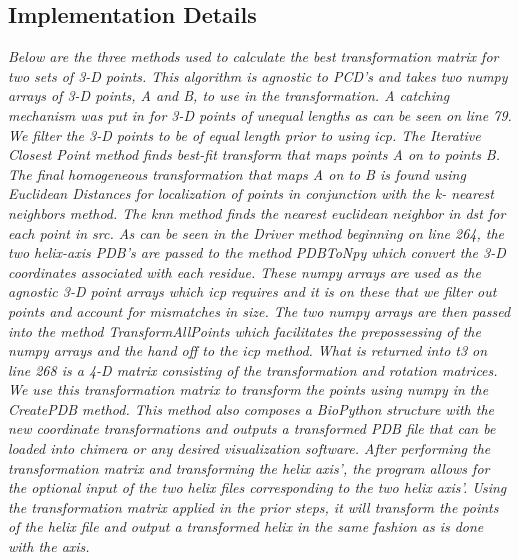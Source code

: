 \documentclass[12pt]{article}
\begin{document}
\subsection*{Implementation Details}

\emph{Below are the three methods used to calculate the best transformation matrix for two sets of 3-D points.  This algorithm is agnostic to PCD's and takes two numpy arrays of 3-D points, A and B, to use in the transformation.  A catching mechanism was put in for 3-D points of unequal lengths as can be seen on line 79.  We filter the 3-D points to be of equal length prior to using icp. The Iterative Closest Point method finds best-fit transform that maps points A on to points B. The  final homogeneous transformation that maps A on to B is found using Euclidean Distances for localization of points in conjunction with the k- nearest neighbors method.  The knn method finds the nearest euclidean neighbor in dst for each point in src. \newline\newline As can be seen in the Driver method beginning on line 264, the two helix-axis PDB's are passed to the method PDBToNpy which convert the 3-D coordinates associated with each residue.  These numpy arrays are used as the agnostic 3-D point arrays which icp requires and it is on these that we filter out points and account for mismatches in size.  The two numpy arrays are then passed into the method TransformAllPoints which facilitates the prepossessing of the numpy arrays and the hand off to the icp method.  What is returned into t3 on line 268 is a 4-D matrix consisting of the transformation and rotation matrices.  We use this transformation matrix to transform the points using numpy in the CreatePDB method.  This method also composes a BioPython structure with the new coordinate transformations and outputs a transformed PDB file that can be loaded into chimera or any desired visualization software.  After performing the transformation matrix and transforming the helix axis', the program allows for the optional input of the two helix files corresponding to the two helix axis'.  Using the transformation matrix applied in the prior steps, it will transform the points of the helix file and output a transformed helix in the same fashion as is done with the axis.  }


\end{document}

